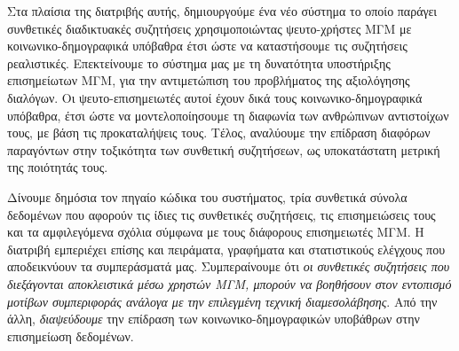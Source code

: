 Στα πλαίσια της διατριβής αυτής, δημιουργούμε ένα νέο σύστημα το οποίο παράγει συνθετικές διαδικτυακές συζητήσεις χρησιμοποιώντας ψευτο-χρήστες ΜΓΜ με κοινωνικο-δημογραφικά υπόβαθρα έτσι ώστε να καταστήσουμε τις συζητήσεις ρεαλιστικές. Επεκτείνουμε το σύστημα μας με τη δυνατότητα υποστήριξης επισημείωτων ΜΓΜ, για την αντιμετώπιση του προβλήματος της αξιολόγησης διαλόγων. Οι ψευτο-επισημειωτές αυτοί έχουν δικά τους κοινωνικο-δημογραφικά υπόβαθρα, έτσι ώστε να μοντελοποίησουμε τη διαφωνία των ανθρώπινων αντιστοίχων τους, με βάση τις προκαταλήψεις τους. Τέλος, αναλύουμε την επίδραση διαφόρων παραγόντων στην τοξικότητα των συνθετική συζητήσεων, ως υποκατάστατη μετρική της ποιότητάς τους. 

Δίνουμε δημόσια τον πηγαίο κώδικα του συστήματος, τρία συνθετικά σύνολα δεδομένων που αφορούν τις ίδιες τις συνθετικές συζητήσεις, τις επισημειώσεις τους και τα αμφιλεγόμενα σχόλια σύμφωνα με τους διάφορους επισημειωτές ΜΓΜ. Η διατριβή εμπεριέχει επίσης και πειράματα, γραφήματα και στατιστικούς ελέγχους που αποδεικνύουν τα συμπεράσματά μας. Συμπεραίνουμε ότι \textit{οι συνθετικές συζητήσεις που διεξάγονται αποκλειστικά μέσω χρηστών ΜΓΜ, μπορούν να βοηθήσουν στον εντοπισμό μοτίβων συμπεριφοράς ανάλογα με την επιλεγμένη τεχνική διαμεσολάβησης}. Από την άλλη, \textit{διαψεύδουμε} την επίδραση των κοινωνικο-δημογραφικών υποβάθρων στην επισημείωση δεδομένων.

